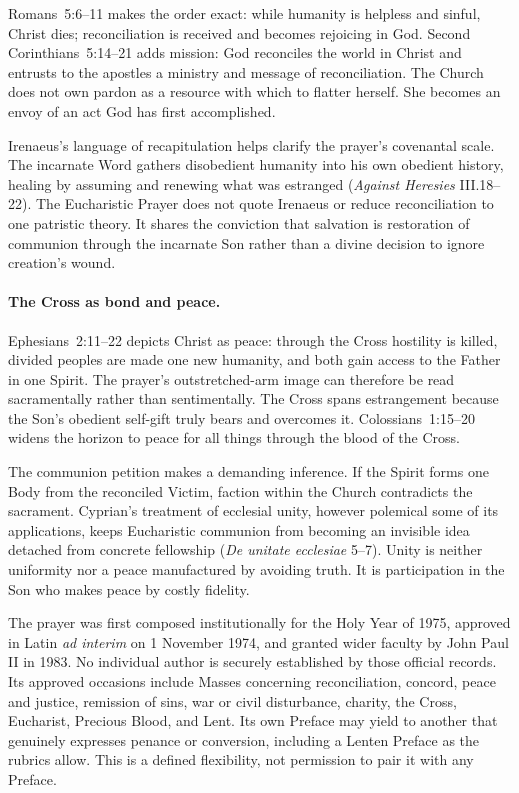 Romans~5:6--11 makes the order exact: while humanity is helpless and sinful, Christ dies; reconciliation is received and becomes rejoicing in God. Second Corinthians~5:14--21 adds mission: God reconciles the world in Christ and entrusts to the apostles a ministry and message of reconciliation. The Church does not own pardon as a resource with which to flatter herself. She becomes an envoy of an act God has first accomplished.

Irenaeus's language of recapitulation helps clarify the prayer's covenantal scale. The incarnate Word gathers disobedient humanity into his own obedient history, healing by assuming and renewing what was estranged (\emph{Against Heresies} III.18--22). The Eucharistic Prayer does not quote Irenaeus or reduce reconciliation to one patristic theory. It shares the conviction that salvation is restoration of communion through the incarnate Son rather than a divine decision to ignore creation's wound.

\paragraph{The Cross as bond and peace.}
Ephesians~2:11--22 depicts Christ as peace: through the Cross hostility is killed, divided peoples are made one new humanity, and both gain access to the Father in one Spirit. The prayer's outstretched-arm image can therefore be read sacramentally rather than sentimentally. The Cross spans estrangement because the Son's obedient self-gift truly bears and overcomes it. Colossians~1:15--20 widens the horizon to peace for all things through the blood of the Cross.

The communion petition makes a demanding inference. If the Spirit forms one Body from the reconciled Victim, faction within the Church contradicts the sacrament. Cyprian's treatment of ecclesial unity, however polemical some of its applications, keeps Eucharistic communion from becoming an invisible idea detached from concrete fellowship (\emph{De unitate ecclesiae} 5--7). Unity is neither uniformity nor a peace manufactured by avoiding truth. It is participation in the Son who makes peace by costly fidelity.

The prayer was first composed institutionally for the Holy Year of 1975, approved in Latin \emph{ad interim} on 1 November 1974, and granted wider faculty by John Paul II in 1983. No individual author is securely established by those official records. Its approved occasions include Masses concerning reconciliation, concord, peace and justice, remission of sins, war or civil disturbance, charity, the Cross, Eucharist, Precious Blood, and Lent. Its own Preface may yield to another that genuinely expresses penance or conversion, including a Lenten Preface as the rubrics allow. This is a defined flexibility, not permission to pair it with any Preface.

